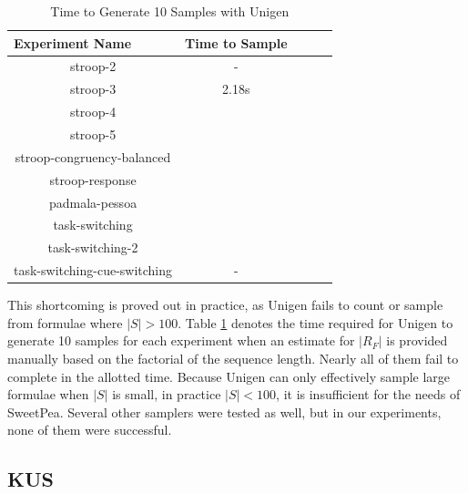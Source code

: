 \begin{table}[t]
  \centering
  \caption{Time to Generate 10 Samples with Unigen}
\begin{tabular}{|c|c|c|c|c|}
\hline
\multicolumn{1}{|l|}{Experiment Name} & Time to Sample  \\ \hline
stroop-2                              & -               \\ \hline
stroop-3                              & 2.18s           \\ \hline
stroop-4                              &                 \\ \hline
stroop-5                              &                 \\ \hline
stroop-congruency-balanced            &                 \\ \hline
stroop-response                       &                 \\ \hline
padmala-pessoa                        &                 \\ \hline
task-switching                        &                 \\ \hline
task-switching-2                      &                 \\ \hline
task-switching-cue-switching          & -               \\ \hline
\end{tabular}
\label{tab:benchmark_experiments_unigen}
\end{table}

This shortcoming is proved out in practice, as Unigen fails to count or sample from formulae where $|S| > 100$. Table \ref{tab:benchmark_experiments_unigen} denotes the time required for Unigen to generate 10 samples for each experiment when an estimate for $|R_F|$ is provided manually based on the factorial of the sequence length. Nearly all of them fail to complete in the allotted time. Because Unigen can only effectively sample large formulae when $|S|$ is small, in practice $|S| < 100$, it is insufficient for the needs of SweetPea. Several other samplers were tested as well, but in our experiments, none of them were successful.


\subsection{KUS}


